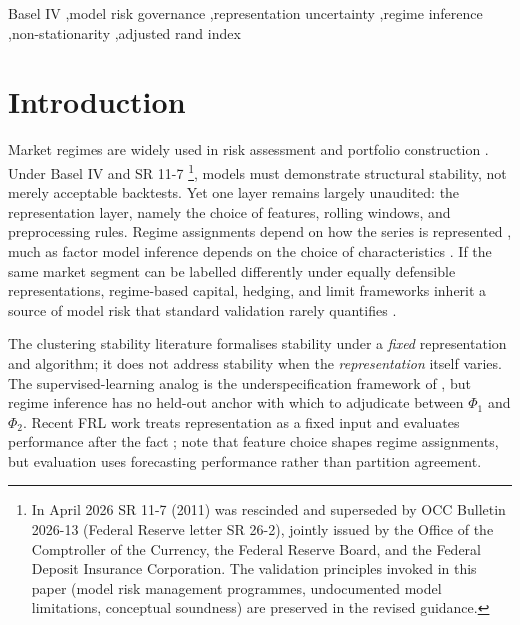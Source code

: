 \documentclass[preprint,12pt,authoryear]{elsarticle}
\begin{document}
\begin{frontmatter}
\begin{keyword}
Basel IV \sep model risk governance \sep representation uncertainty \sep regime inference \sep non-stationarity \sep adjusted rand index
\end{keyword}

\end{frontmatter}
\sloppy

\section{Introduction}

Market regimes are widely used in risk assessment and portfolio construction \citep{Hamilton1989}. Under Basel IV and SR 11-7 \citep{SR117}\footnote{In April 2026 SR 11-7 (2011) was rescinded and superseded by OCC Bulletin 2026-13 (Federal Reserve letter SR 26-2), jointly issued by the Office of the Comptroller of the Currency, the Federal Reserve Board, and the Federal Deposit Insurance Corporation. The validation principles invoked in this paper (model risk management programmes, undocumented model limitations, conceptual soundness) are preserved in the revised guidance.}, models must demonstrate structural stability, not merely acceptable backtests. Yet one layer remains largely unaudited: the representation layer, namely the choice of features, rolling windows, and preprocessing rules. Regime assignments depend on how the series is represented \citep{BengioCourvilleVincent2013}, much as factor model inference depends on the choice of characteristics \citep{GuKellyXiu2020,KellyPruittSu2019}. If the same market segment can be labelled differently under equally defensible representations, regime-based capital, hedging, and limit frameworks inherit a source of model risk that standard validation rarely quantifies \citep{DanielssonJamesValenzuelaZer2016}.

The clustering stability literature \citep{BenDavidLuxburgPal06,vonLuxburg2010} formalises stability under a \emph{fixed} representation and algorithm; it does not address stability when the \emph{representation} itself varies. The supervised-learning analog is the underspecification framework of \citet{DAmouretal2022}, but regime inference has no held-out anchor with which to adjudicate between $\Phi_1$ and $\Phi_2$. Recent FRL work treats representation as a fixed input and evaluates performance after the fact \citep{Kirby2023FRL,BlazsekKongShadoff2025,Ampountolas2025FRL,WangYuanQu2025FRL}; \citet{Ampountolas2025FRL} note that feature choice shapes regime assignments, but evaluation uses forecasting performance rather than partition agreement.
\end{document}
